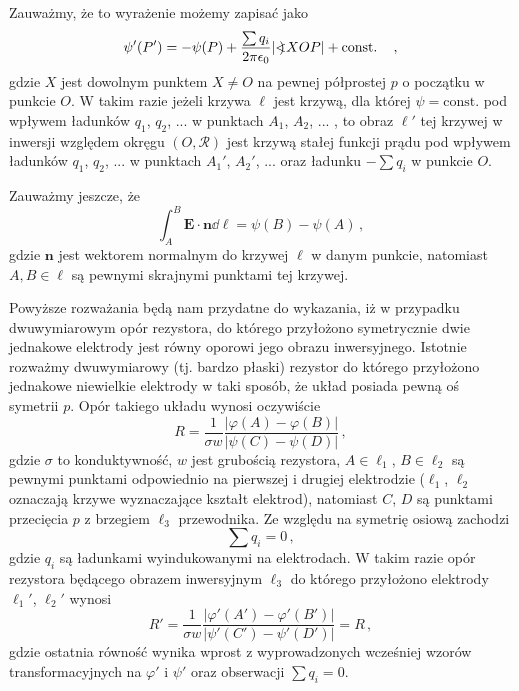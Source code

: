 \documentclass[../main.tex]{subfiles}
\begin{document}
Zauważmy, że to wyrażenie możemy zapisać jako
\begin{equation*}
    \psi'(P')=-\psi(P)+\frac{\sum q_i}{2\pi\epsilon_0}|\mathord{<\mspace{-9mu}\mathrel{)}\mspace{2mu}} XOP|+\text{const.}\quad\,,
\end{equation*}
gdzie \(X\) jest dowolnym punktem \(X\neq O\) na pewnej półprostej \(p\) o początku w punkcie \(O\). W takim razie jeżeli krzywa \(\ell\) jest krzywą, dla której \(\psi=\text{const.}\) pod wpływem ładunków \(q_1\), \(q_2\), ... w punktach \(A_1\), \(A_2\), ... , to obraz \(\ell'\) tej krzywej w inwersji względem okręgu \((O,\mathscr{R})\) jest krzywą stałej funkcji prądu pod wpływem ładunków \(q_1\), \(q_2\), ... w punktach \(A_1'\), \(A_2'\), ... oraz ładunku \(-\sum q_i\) w punkcie \(O\).
\medskip

Zauważmy jeszcze, że
\begin{equation*}
\int_A^B\mathbf{E}\cdot{\mathbf{n}}\dd{\ell}=\psi(B)-\psi(A)\,,
\end{equation*}
gdzie \(\mathbf{n}\) jest wektorem normalnym do krzywej \(\ell\) w danym punkcie, natomiast \(A,B\in\ell\) są pewnymi skrajnymi punktami tej krzywej.
\medskip

Powyższe rozważania będą nam przydatne do wykazania, iż w przypadku dwuwymiarowym opór rezystora, do którego przyłożono symetrycznie dwie jednakowe elektrody jest równy oporowi jego obrazu inwersyjnego. Istotnie rozważmy dwuwymiarowy (tj. bardzo płaski) rezystor do którego przyłożono jednakowe niewielkie elektrody w taki sposób, że układ posiada pewną oś symetrii \(p\). Opór takiego układu wynosi oczywiście
\begin{equation*}
    R=\frac{1}{\sigma w}\frac{|\varphi(A)-\varphi(B)|}{|\psi(C)-\psi(D)|}\,,
\end{equation*}
gdzie \(\sigma\) to konduktywność, \(w\) jest grubością rezystora, \(A\in\ell_1\), \(B\in\ell_2\) są pewnymi punktami odpowiednio na pierwszej i drugiej elektrodzie (\(\ell_1\), \(\ell_2\) oznaczają krzywe wyznaczające kształt elektrod), natomiast \(C\), \(D\) są punktami przecięcia \(p\) z brzegiem \(\ell_3\) przewodnika. Ze względu na symetrię osiową zachodzi
\begin{equation*}
    \sum q_i=0\,,
\end{equation*}
gdzie \(q_i\) są ładunkami wyindukowanymi na elektrodach. W takim razie opór rezystora będącego obrazem inwersyjnym \(\ell_3\) do którego przyłożono elektrody \(\ell_1'\), \(\ell_2'\) wynosi
\begin{equation*}
    R'=\frac{1}{\sigma w}\frac{|\varphi'(A')-\varphi'(B')|}{|\psi'(C')-\psi'(D')|}=R\,,
\end{equation*}
gdzie ostatnia równość wynika wprost z wyprowadzonych wcześniej wzorów transformacyjnych na \(\varphi'\) i \(\psi'\) oraz obserwacji \(\sum q_i=0\).
\newpage
\end{document}
